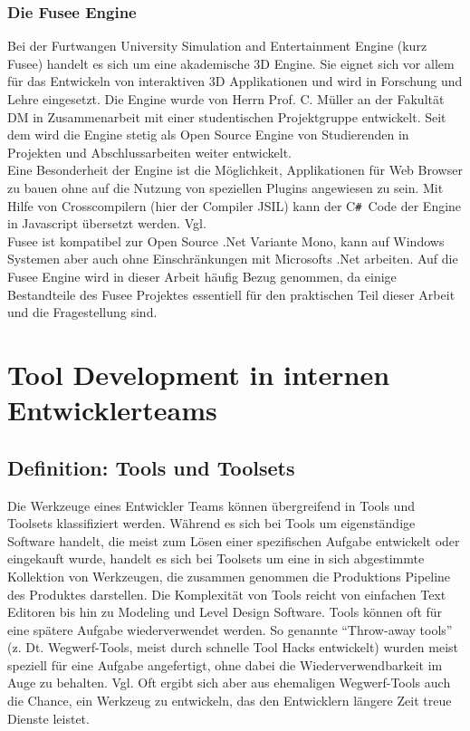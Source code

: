 \documentclass[pagesize, paper=a4, fontsize=12pt, titlepage=true, headings=small, headnosepline, abstractoff, liststotoc, nochapterprefix, plainheadsepline, twoside]{scrreprt}
\newcommand{\CSS}{C\texttt{\# }}
\begin{document}
\subsection{Die Fusee Engine}
Bei der Furtwangen University Simulation and Entertainment Engine (kurz Fusee) handelt es sich um eine akademische 3D Engine. Sie eignet sich vor allem für das Entwickeln von interaktiven 3D Applikationen und wird in Forschung und Lehre eingesetzt. Die Engine wurde von Herrn Prof. C. Müller an der Fakultät DM in Zusammenarbeit mit einer studentischen Projektgruppe entwickelt. Seit dem wird die Engine stetig als Open Source Engine von Studierenden in Projekten und Abschlussarbeiten weiter entwickelt.\\

Eine Besonderheit der Engine ist die Möglichkeit, Applikationen für Web Browser zu bauen ohne auf die Nutzung von speziellen Plugins angewiesen zu sein. Mit Hilfe von Crosscompilern (hier der Compiler JSIL) kann der \CSS Code der Engine in Javascript übersetzt werden. Vgl.  \\

Fusee ist kompatibel zur Open Source .Net Variante Mono, kann auf Windows Systemen aber auch ohne Einschränkungen mit Microsofts .Net arbeiten. Auf die Fusee Engine wird in dieser Arbeit häufig Bezug genommen, da einige Bestandteile des Fusee Projektes essentiell für den praktischen Teil dieser Arbeit und die Fragestellung sind.



\chapter{Tool Development in internen Entwicklerteams}

\section{Definition: Tools und Toolsets}
Die Werkzeuge eines Entwickler Teams können übergreifend in Tools und Toolsets klassifiziert werden. Während es sich bei Tools um eigenständige Software handelt, die meist zum Lösen einer spezifischen Aufgabe entwickelt oder eingekauft wurde, handelt es sich bei Toolsets um eine in sich abgestimmte Kollektion von Werkzeugen, die zusammen genommen die Produktions Pipeline des Produktes darstellen. Die Komplexität von Tools reicht von einfachen Text Editoren bis hin zu Modeling und Level Design Software.
Tools können oft für eine spätere Aufgabe wiederverwendet werden. So genannte “Throw-away tools” (z. Dt. Wegwerf-Tools, meist durch schnelle Tool Hacks entwickelt) wurden meist speziell für eine Aufgabe angefertigt, ohne dabei die Wiederverwendbarkeit im Auge zu behalten. Vgl. \autocite[S. 3]{Wihlidal2006}
Oft ergibt sich aber aus ehemaligen Wegwerf-Tools auch die Chance, ein Werkzeug zu entwickeln, das den Entwicklern längere Zeit treue Dienste leistet.
\end{document}
